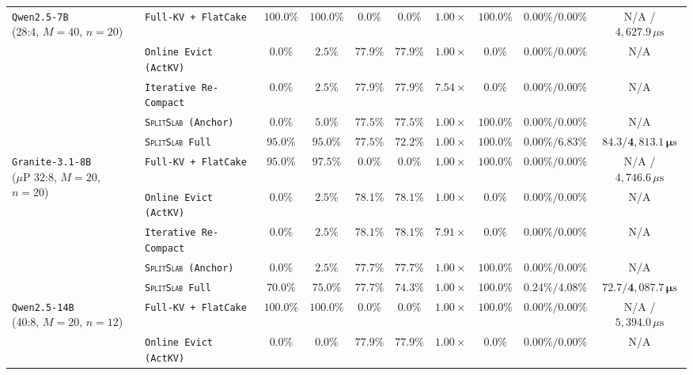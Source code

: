 \documentclass[pdflatex,sn-mathphys-num]{sn-jnl}
\theoremstyle{thmstyleone}
\newcommand{\SplitSlab}{\textsc{SplitSlab}}
\begin{document}
\begin{table}[t]
{\begin{tabular}{@{}llcccccccc@{}}
\midrule
\multirow{5}{*}{\parbox{2.2cm}{\texttt{Qwen2.5-7B}\\(28:4, $M{=}40$, $n{=}20$)}}
 & \texttt{Full-KV + FlatCake} & $100.0\%$ & $100.0\%$ & $0.0\%$ & $0.0\%$ & $1.00\times$ & $100.0\%$ & $0.00\% / 0.00\%$ & N/A / $4{,}627.9\,\mu\mathrm{s}$ \\
 & \texttt{Online Evict (ActKV)} & $0.0\%$ & $2.5\%$ & $77.9\%$ & $77.9\%$ & $1.00\times$ & $0.0\%$ & $0.00\% / 0.00\%$ & N/A \\
 & \texttt{Iterative Re-Compact} & $0.0\%$ & $2.5\%$ & $77.9\%$ & $77.9\%$ & $7.54\times$ & $0.0\%$ & $0.00\% / 0.00\%$ & N/A \\
 & \texttt{\SplitSlab{} (Anchor)} & $0.0\%$ & $5.0\%$ & $77.5\%$ & $77.5\%$ & $1.00\times$ & $100.0\%$ & $0.00\% / 0.00\%$ & N/A \\
 & \texttt{\SplitSlab{} Full} & $\mathbf{95.0\%}$ & $\mathbf{95.0\%}$ & $\mathbf{77.5\%}$ & $\mathbf{72.2\%}$ & $\mathbf{1.00\times}$ & $\mathbf{100.0\%}$ & $\mathbf{0.00\% / 6.83\%}$ & $\mathbf{84.3 / 4{,}813.1\,\mu\mathrm{s}}$ \\
\midrule
\multirow{5}{*}{\parbox{2.2cm}{\texttt{Granite-3.1-8B}\\($\mu\text{P}$ 32:8, $M{=}20$, $n{=}20$)}}
 & \texttt{Full-KV + FlatCake} & $95.0\%$ & $97.5\%$ & $0.0\%$ & $0.0\%$ & $1.00\times$ & $100.0\%$ & $0.00\% / 0.00\%$ & N/A / $4{,}746.6\,\mu\mathrm{s}$ \\
 & \texttt{Online Evict (ActKV)} & $0.0\%$ & $2.5\%$ & $78.1\%$ & $78.1\%$ & $1.00\times$ & $0.0\%$ & $0.00\% / 0.00\%$ & N/A \\
 & \texttt{Iterative Re-Compact} & $0.0\%$ & $2.5\%$ & $78.1\%$ & $78.1\%$ & $7.91\times$ & $0.0\%$ & $0.00\% / 0.00\%$ & N/A \\
 & \texttt{\SplitSlab{} (Anchor)} & $0.0\%$ & $2.5\%$ & $77.7\%$ & $77.7\%$ & $1.00\times$ & $100.0\%$ & $0.00\% / 0.00\%$ & N/A \\
 & \texttt{\SplitSlab{} Full} & $\mathbf{70.0\%}$ & $\mathbf{75.0\%}$ & $\mathbf{77.7\%}$ & $\mathbf{74.3\%}$ & $\mathbf{1.00\times}$ & $\mathbf{100.0\%}$ & $\mathbf{0.24\% / 4.08\%}$ & $\mathbf{72.7 / 4{,}087.7\,\mu\mathrm{s}}$ \\
\midrule
\multirow{5}{*}{\parbox{2.2cm}{\texttt{Qwen2.5-14B}\\(40:8, $M{=}20$, $n{=}12$)}}
 & \texttt{Full-KV + FlatCake} & $100.0\%$ & $100.0\%$ & $0.0\%$ & $0.0\%$ & $1.00\times$ & $100.0\%$ & $0.00\% / 0.00\%$ & N/A / $5{,}394.0\,\mu\mathrm{s}$ \\
 & \texttt{Online Evict (ActKV)} & $0.0\%$ & $0.0\%$ & $77.9\%$ & $77.9\%$ & $1.00\times$ & $0.0\%$ & $0.00\% / 0.00\%$ & N/A \\

\end{tabular}}
\end{table}
\end{document}
